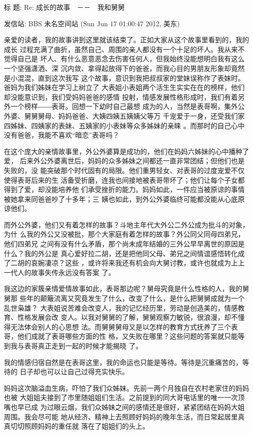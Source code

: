 \documentclass[12pt]{book}
\begin{document}
标  题: Re: 成长的故事　－－　我和舅舅

发信站: BBS 未名空间站 (Sun Jun 17 01:00:47 2012, 美东)

亲爱的读者，我的故事讲到这里就该结束了。正如大家从这个故事里看到的，我的成长
过程充满了曲折，虽然自己、周围的亲人都没有一个十足的坏人。我从来不觉得自己是
坏人、有什么恶意恶念去伤害任何人，但我始终没能想明白我有这么一个坚强潇洒、深
沉内敛、拿得起放得下的爸爸，而我心目的男朋友形象却竟然是小混混，直到这次我写
这个故事，意识到我把叔叔家的堂妹误称作了表妹时。爸妈为我们姊妹在学习上树立了
大表姐小表姐两个活生生实实在在的榜样，他们却没能意识到，我们受妈妈爸爸的感情
投射，情感发展性格形成时，我们有着另外一个榜样――表哥。回想一下幼时自己最想
成为的人，当然是表哥啊，集外公外婆、舅舅舅母、妈妈爸爸、大姨四姨五姨姨父等万
千宠爱于一身，还受我们家四姊妹、四姨家的表妹、五姨家的小表妹等众多姊妹的亲睐
。而那时的自己心中没有爸爸，我能不喜欢“暗恋”表哥吗？

在这个庞大的亲情故事里，外公外婆算是成功的，他们在妈妈六姊妹的心中播种了爱，
后来外公外婆离世后，妈妈的众多姊妹之间都还一直非常团结；但他们也是失败的，没
能突破那个时代固有的局限。他们重男轻女、对表哥的过度宠爱不仅使得表哥后来的生
活备受折磨，连我也间接地被表哥带坏了；他们让每个子女都得到了爱，却没能培养他
们承受挫折的能力。妈妈如此，一件应当被原谅的事情被她拿来同爸爸吵了十多年；三
姨也如此，到外公外婆临终可能都没能从心底原谅他们。

而外公外婆，他们又有着怎样的故事？斗地主年代大外公二外公成为批斗的对象，为什
么我的外公又没被批，那个大家庭有着怎样的故事？外公同父同母四弟兄，他们四弟兄
之间有没有什么矛盾，那个尚未成年结婚的三外公早早离世的原因是什么？我的外公是
真心爱好拉二胡，还是把他同父母、弟兄之间情谊感悟转化成了二胡的哀婉凄凉？这些
，或许将来我还有机会向大舅讨教，或许也就成为上上一代人的故事失传永远没有答案
了。

我这边的家簇亲情爱情故事如此，表哥那边呢？舅母究竟是什么性格的人，我的舅舅那
些年的颠簸流离又究竟发生了什么，改变了什么，是什么把舅舅成就为一个乱世枭雄？
大表姐说苦难会改变人，我的记忆经历里，劳动是创造美的，情感教育、性格发展会改
变人。以我对舅舅的了解，舅舅观察力敏锐，很浪漫，却不懂得无法体会别人的心思想
法。而舅舅舅母又是以怎样的教育方式抚养了三个表哥，他们成就了表哥哪些方面的性
格，又失败在哪里？这些问题的答案就只能等到我与表哥真正走到一起的时候才能揭晓
了。

我的情感归宿自然是在表哥这里，我的命运也只能是等待。等待是沉重痛苦的，等待的
日子却也可以让自己过得充实快乐。

妈妈这次脑溢血生病，吓怕了我们众姊妹。先前一两个月独自在农村老家住的妈妈也被
大姐姐夫接到了市里随姐姐们生活。之前提到的同大哥电话里的唯一一次顶嘴也早已成
为过眼云烟，我们众姊妹之间的感情还是很好，紧紧团结在妈妈大姐周围。我会尽可能
地从经济、精神上去照顾好妈妈的晚年生活，而日常起居里真真切切照顾妈妈的重任就
落在了姐姐们的头上。
\end{document}
